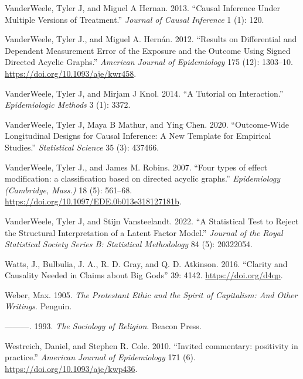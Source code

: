 \documentclass[
  singlecolumn]{report}
\newlength{\cslhangindent}
\newlength{\cslentryspacingunit} %
\newenvironment{CSLReferences}[2] %
 {%
  \setlength{\parindent}{0pt}
  \ifodd #1
  \let\oldpar\par
  \def\par{\hangindent=\cslhangindent\oldpar}
  \fi
  \setlength{\parskip}{#2\cslentryspacingunit}
 }%
 {}
\begin{document}
\begin{CSLReferences}{1}{0}
\leavevmode{}%
VanderWeele, Tyler J, and Miguel A Hernan. 2013. {``Causal Inference
Under Multiple Versions of Treatment.''} \emph{Journal of Causal
Inference} 1 (1): 120.

\leavevmode{}%
VanderWeele, Tyler J., and Miguel A. Hernán. 2012. {``Results on
Differential and Dependent Measurement Error of the Exposure and the
Outcome Using Signed Directed Acyclic Graphs.''} \emph{American Journal
of Epidemiology} 175 (12): 1303--10.
\url{https://doi.org/10.1093/aje/kwr458}.

\leavevmode{}%
VanderWeele, Tyler J, and Mirjam J Knol. 2014. {``A Tutorial on
Interaction.''} \emph{Epidemiologic Methods} 3 (1): 3372.

\leavevmode{}%
VanderWeele, Tyler J, Maya B Mathur, and Ying Chen. 2020.
{``Outcome-Wide Longitudinal Designs for Causal Inference: A New
Template for Empirical Studies.''} \emph{Statistical Science} 35 (3):
437466.

\leavevmode{}%
VanderWeele, Tyler J., and James M. Robins. 2007. {``Four types of
effect modification: a classification based on directed acyclic
graphs.''} \emph{Epidemiology (Cambridge, Mass.)} 18 (5): 561--68.
\url{https://doi.org/10.1097/EDE.0b013e318127181b}.

\leavevmode{}%
VanderWeele, Tyler J, and Stijn Vansteelandt. 2022. {``A Statistical
Test to Reject the Structural Interpretation of a Latent Factor
Model.''} \emph{Journal of the Royal Statistical Society Series B:
Statistical Methodology} 84 (5): 20322054.

\leavevmode{}%
Watts, J., Bulbulia, J. A., R. D. Gray, and Q. D. Atkinson. 2016.
{``Clarity and Causality Needed in Claims about Big Gods''} 39: 4142.
\url{https://doi.org/d4qp}.

\leavevmode{}%
Weber, Max. 1905. \emph{The Protestant Ethic and the Spirit of
Capitalism: And Other Writings}. Penguin.

\leavevmode{}%
---------. 1993. \emph{The Sociology of Religion}. Beacon Press.

\leavevmode{}%
Westreich, Daniel, and Stephen R. Cole. 2010. {``Invited commentary:
positivity in practice.''} \emph{American Journal of Epidemiology} 171
(6). \url{https://doi.org/10.1093/aje/kwp436}.


\end{CSLReferences}
\end{document}
